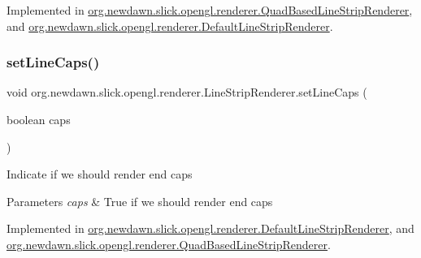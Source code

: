 Implemented in \mbox{\hyperlink{classorg_1_1newdawn_1_1slick_1_1opengl_1_1renderer_1_1_quad_based_line_strip_renderer_a5eb1002e1c8f2d044bc1d1e184bcbc62}{org.\+newdawn.\+slick.\+opengl.\+renderer.\+Quad\+Based\+Line\+Strip\+Renderer}}, and \mbox{\hyperlink{classorg_1_1newdawn_1_1slick_1_1opengl_1_1renderer_1_1_default_line_strip_renderer_adec638ecbe7cb11adb68d6ad05e47940}{org.\+newdawn.\+slick.\+opengl.\+renderer.\+Default\+Line\+Strip\+Renderer}}.

\mbox{\label{interfaceorg_1_1newdawn_1_1slick_1_1opengl_1_1renderer_1_1_line_strip_renderer_ac2c299158c60d76e8745759dd2dc8633}} 
\subsubsection{\texorpdfstring{set\+Line\+Caps()}{setLineCaps()}}
{\footnotesize\ttfamily void org.\+newdawn.\+slick.\+opengl.\+renderer.\+Line\+Strip\+Renderer.\+set\+Line\+Caps (\begin{DoxyParamCaption}\item[{boolean}]{caps }\end{DoxyParamCaption})}

Indicate if we should render end caps


\begin{DoxyParams}{Parameters}
{\em caps} & True if we should render end caps \\
\hline
\end{DoxyParams}


Implemented in \mbox{\hyperlink{classorg_1_1newdawn_1_1slick_1_1opengl_1_1renderer_1_1_default_line_strip_renderer_a4ab21f80fe9663e729febb2206e201a5}{org.\+newdawn.\+slick.\+opengl.\+renderer.\+Default\+Line\+Strip\+Renderer}}, and \mbox{\hyperlink{classorg_1_1newdawn_1_1slick_1_1opengl_1_1renderer_1_1_quad_based_line_strip_renderer_a7b6834b1bd47220f6ebd45ee60672b30}{org.\+newdawn.\+slick.\+opengl.\+renderer.\+Quad\+Based\+Line\+Strip\+Renderer}}.

\mbox{\label{interfaceorg_1_1newdawn_1_1slick_1_1opengl_1_1renderer_1_1_line_strip_renderer_afc8159c0766c0d177b402cf311d9a7b8}} 
